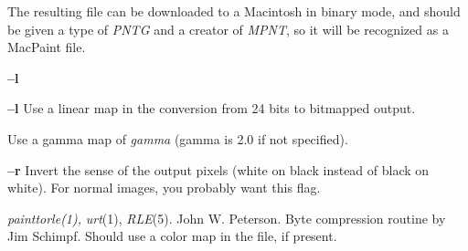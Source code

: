 The resulting file can be downloaded to a Macintosh in binary mode,
and should be given a type of 
{\it PNTG}
and a creator of 
{\it MPNT}{\rm ,}
so it will be recognized as a MacPaint file.
\begin{TPlist}{{\bf --l}}
\item[{{\bf --l}}]
Use a linear map in the conversion from 24 bits to bitmapped output.
\item[{%
\bf --g\ %
\rm [%
\it \ gamma\ %
\rm ]}]
Use a gamma map of 
{\it gamma}
(gamma is 2.0 if not specified).
\item[{{\bf --r}}]
Invert the sense of the output pixels (white on black instead of black
on white).  For normal images, you probably want this flag.
\end{TPlist}
{\it painttorle(1),}
{\it urt}{\rm (1),}
{\it RLE}{\rm (5).}
John W. Peterson.  Byte compression routine by Jim Schimpf.
Should use a color map in the file, if present.
\newpage


